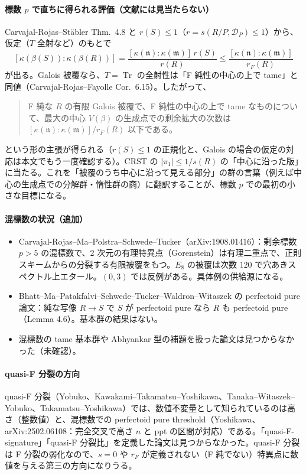 \documentclass[11pt,a4paper]{ltjsarticle}
\theoremstyle{plain}
\theoremstyle{definition}
\theoremstyle{remark}
\theoremstyle{plain}
\newcommand{\m}{\mathfrak{m}}
\newcommand{\n}{\mathfrak{n}}
\newcommand{\Tr}{\operatorname{Tr}}
\begin{document}
\paragraph{標数 $p$ で直ちに得られる評価（文献には見当たらない）}
Carvajal-Rojas--Stäbler Thm.~4.8 と $r(S)\le1$（$r = s(R/P,\mathscr{D}_P)\le1$）から、仮定（$T$ 全射など）のもとで
\[
  [\kappa(\beta(S)):\kappa(\beta(R))] = \frac{[\kappa(\n):\kappa(\m)]\,r(S)}{r(R)}\le\frac{[\kappa(\n):\kappa(\m)]}{r_F(R)}
\]
が出る。Galois 被覆なら、$T = \Tr$ の全射性は「F 純性の中心の上で tame」と同値（Carvajal-Rojas--Fayolle Cor.~6.15）。したがって、
\begin{quote}
F 純な $R$ の有限 Galois 被覆で、F 純性の中心の上で tame なものについて、最大の中心 $V(\beta)$ の生成点での剰余拡大の次数は $[\kappa(\n):\kappa(\m)]/r_F(R)$ 以下である。
\end{quote}
という形の主張が得られる（$r(S)\le1$ の正規化と、Galois の場合の仮定の対応は本文でもう一度確認する）。CRST の $|\pi_1|\le1/s(R)$ の「中心に沿った版」に当たる。これを「被覆のうち中心に沿って見える部分」の群の言葉（例えば中心の生成点での分解群・惰性群の商）に翻訳することが、標数 $p$ での最初の小さな目標になる。

\paragraph{混標数の状況（追加）}
\begin{itemize}
  \item Carvajal-Rojas--Ma--Polstra--Schwede--Tucker（arXiv:1908.01416）：剰余標数 $p>5$ の混標数で、2 次元の有理特異点（Gorenstein）は有理二重点で、正則スキームからの分裂する有限被覆をもつ。$E_8$ の被覆は次数 $120$ で穴あきスペクトル上エタール。$(0,3)$ では反例がある。具体例の供給源になる。
  \item Bhatt--\allowbreak Ma--\allowbreak Patakfalvi--\allowbreak Schwede--\allowbreak Tucker--\allowbreak Waldron--\allowbreak Witaszek の perfectoid pure 論文：純な写像 $R\to S$ で $S$ が perfectoid pure なら $R$ も perfectoid pure（Lemma 4.6）。基本群の結果はない。
  \item 混標数の tame 基本群や Abhyankar 型の補題を扱った論文は見つからなかった（未確認）。
\end{itemize}

\paragraph{quasi-F 分裂の方向}
quasi-F 分裂（Yobuko、Kawakami--Takamatsu--Yoshikawa、Tanaka--Witaszek--Yobuko、Takamatsu--Yoshikawa）では、数値不変量として知られているのは高さ（整数値）と、混標数での perfectoid pure threshold（Yoshikawa、arXiv:2502.06108：完全交叉で高さ $n$ と ppt の区間が対応）である。「quasi-F-signature」「quasi-F 分裂比」を定義した論文は見つからなかった。quasi-F 分裂は F 分裂の弱化なので、$s = 0$ や $r_F$ が定義されない（F 純でない）特異点に数値を与える第三の方向になりうる。
\end{document}
